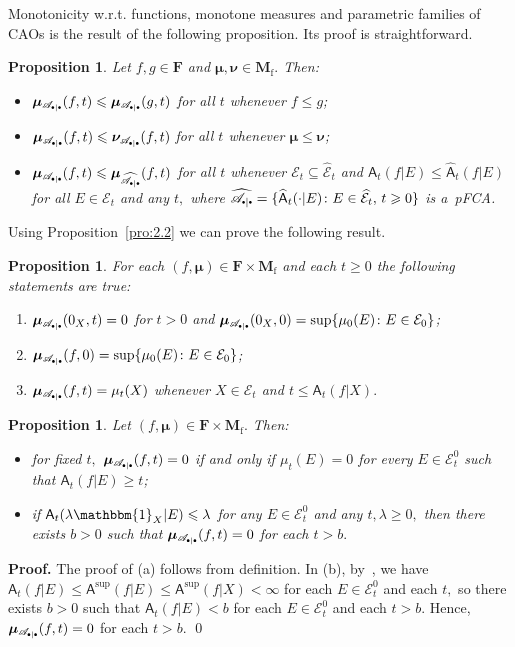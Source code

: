 \documentclass[preprint,11pt]{elsarticle}
\newtheorem{proposition}[tw]{Proposition}
\theoremstyle{definition}
\renewenvironment{proof}[1][\textbf{Proof}]{\noindent\textbf{#1.} }{\hfill\qed\vspace{2.5ex}}
\newcommand\bF{\mathbf{F}} %
\newcommand\bMf{\mathbf{M}_{\mathrm{f}}}%
\newcommand\cE{{\mathcal E}}
\newcommand\sA{\mathsf{A}}
\newcommand\aAd[3][E]{\sA_{#3}(#2|#1)}%
\newcommand\sbullet[1][.5]{\mathbin{\vcenter{\hbox{\scalebox{#1}{$\bullet$}}}}}
\newcommand\bpeA{\mathscr {A}_{\sbullet|\sbullet}}%
\newcommand{\bmu}{\boldsymbol{\mu}}
\newcommand{\bnu}{\boldsymbol{\nu}}
\newcommand\bmub[1][\bpeA]{\bmu_{#1}}
\newcommand\bnub[1][\bpeA]{\bnu_{#1}}
\renewcommand\ge{\geqslant}
\renewcommand\le{\leqslant}
\newcommand{\mI}[1]{\mathbbm{1}_{#1}}%
\begin{document}
Monotonicity w.r.t. functions, monotone measures and parametric families of CAOs is the result of the following proposition. Its proof is straightforward.

\begin{proposition}\label{pro:4.9}
Let $f,g\in\bF$ and $\bmu,\bnu\in\bMf.$ Then:
    \begin{itemize}[noitemsep]
    \item[(a)] $\bmub(f,t)\le \bmub(g,t)$ for  all $t$ whenever $f\le g$;

    \item[(b)] $\bmub(f,t)\le \bnub(f,t)$ for all $t$ whenever $\bmu\le\bnu$;

    \item[(c)] $\bmub(f,t)\le \bmub[\widehat{\bpeA}](f,t)$ for all $t$ whenever $\cE_t\subseteq\widehat{\cE}_t$ and $\aAd{f}{t}\le \widehat{\sA}_t(f|E)$ for all $E\in\cE_t$ and any $t,$  where  $\widehat{\bpeA}=\{\widehat{\sA}_t(\cdot|E) \colon E\in \widehat{\cE}_t,\,t\ge 0\}$ is a~pFCA.
      \end{itemize}
\end{proposition}

Using Proposition~\ref{pro:2.2} we can prove the following result.

\begin{proposition}\label{prop:3.6}
For each $(f,\bmu)\in\bF\times \bMf$ and each $t\ge 0$ the following statements are true:
    \begin{enumerate}[noitemsep]
        \item[(a)] $\bmub(0_X,t)=0$  for $t>0$ and $\bmub(0_X,0)=\sup\{\mu_0(E)\colon E\in \cE_0\}$;

         \item[(b)] $\bmub(f,0)=\sup\{\mu_0(E)\colon E\in \cE_0\}$;

        \item[(c)]  $\bmub (f,t)=\mu_t(X)$ whenever $X\in\cE_t$  and $t\le \aAd[X]{f}{t}.$
    \end{enumerate}
\end{proposition}


\begin{proposition}
Let $(f,\bmu)\in\bF\times\bMf.$ Then:
\begin{itemize}[noitemsep]
    \item[(a)] for fixed $t,$ $\bmub(f,t)=0$  if and only if $\mu_t(E)=0$ for every $E\in \cE_t^0$ such that
    $\aAd{f}{t}\ge t$;

    \item[(b)] if $\sA_t(\lambda\mI{X}|E)\le\lambda$ for any    $E\in\cE^0_t$ and any $t,\lambda \ge 0,$  then there exists $b>0$ such that $\bmub(f,t)=0$ for each $t>b.$
\end{itemize}
\end{proposition}
\begin{proof} The proof of (a) follows from definition. In (b), by~\cite[Prop. 3.8\,(a)]{BHHK21}, we have $\aAd{f}{t}\le\sA^{\sup}(f|E)\le  \sA^{\sup}(f|X)<\infty$ for each $E\in\cE^0_t$ and each $t,$ so there exists $b > 0$ such that  $\aAd{f}{t}< b$ for each $E\in \cE_t^0$ and each $t>b.$ Hence, $\bmub(f,t)=0$ for each $t>b.$
\end{proof}
\end{document}
